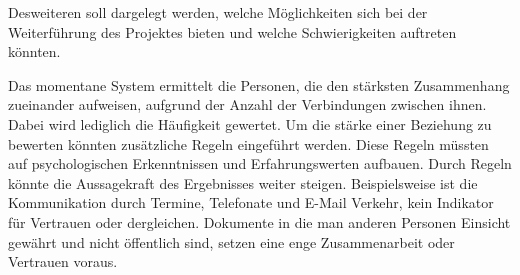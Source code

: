 Desweiteren soll dargelegt werden, welche Möglichkeiten sich bei der Weiterführung des Projektes bieten und welche Schwierigkeiten auftreten könnten. 

Das momentane System ermittelt die Personen, die den stärksten Zusammenhang zueinander aufweisen, aufgrund der Anzahl der Verbindungen zwischen ihnen. Dabei wird lediglich die Häufigkeit gewertet. Um die stärke einer Beziehung zu bewerten könnten zusätzliche Regeln eingeführt werden. Diese Regeln müssten auf psychologischen Erkenntnissen und Erfahrungswerten aufbauen. Durch Regeln könnte die Aussagekraft des Ergebnisses weiter steigen. Beispielsweise ist die Kommunikation durch Termine, Telefonate und E-Mail Verkehr, kein Indikator für Vertrauen oder dergleichen. Dokumente in die man anderen Personen Einsicht gewährt und nicht öffentlich sind, setzen eine enge Zusammenarbeit oder Vertrauen voraus.  
